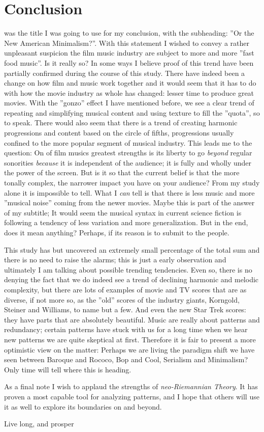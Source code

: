 \chapter{Conclusion}\label{ch:conclusion}

 was the title I was going to use for my conclusion, with the subheading: ''Or the New American Minimalism?''. With this statement I wished to convey a rather unpleasant suspicion the film music industry are subject to more and more ''fast food music''. Is it really so? In some ways I believe proof of this trend have been partially confirmed during the course of this study. There have indeed been a change on how film and music work together and it would seem that it has to do with how the movie industry as whole has changed: lesser time to produce great movies. With the ''gonzo'' effect I have mentioned before, we see a clear trend of repeating and simplifying musical content and using texture to fill the ''quota'', so to speak. There would also seem that there is a trend of creating harmonic progressions and content based on the circle of fifths, progressions usually confined to the more popular segment of musical industry. This leads me to the question: On of film musics greatest strengths is its liberty to go \textit{beyond} regular sonorities \textit{because} it is independent of the audience; it is fully and wholly under the power of the screen. But is it so that the current belief is that the more tonally complex, the narrower impact you have on your audience? From my study alone it is impossible to tell. What I \textit{can} tell is that there is less music and more ''musical noise'' coming from the newer movies. Maybe this is part of the answer of my subtitle; It would seem the musical syntax in current science fiction is following a tendency of less variation and more generalization. But in the end, does it mean anything? Perhaps, if its reason is to submit to the people.

This study has but uncovered an extremely small percentage of the total sum and there is no need to raise the alarms; this is just a early observation and ultimately I am talking about possible trending tendencies. Even so, there is no denying the fact that we do indeed see a trend of declining harmonic and melodic complexity, but there are lots of examples of movie and TV scores that are as diverse, if not more so, as the ''old'' scores of the industry giants, Korngold, Steiner and Williams, to name but a few. And even the new Star Trek scores: they have parts that are absolutely beautiful. Music are really about patterns and redundancy; certain patterns have stuck with us for a long time when we hear new patterns we are quite skeptical at first. Therefore it is fair to present a more optimistic view on the matter: Perhaps we are living the paradigm shift we have seen between Baroque and Rococo, Bop and Cool, Serialism and Minimalism? Only time will tell where this is heading.

As a final note I wish to applaud the strengths of \textit{neo-Riemannian Theory}. It has proven a most capable tool for analyzing patterns, and I hope that others will use it as well to explore its boundaries on and beyond. 

\vspace{5cm}
\center
Live long, and prosper

